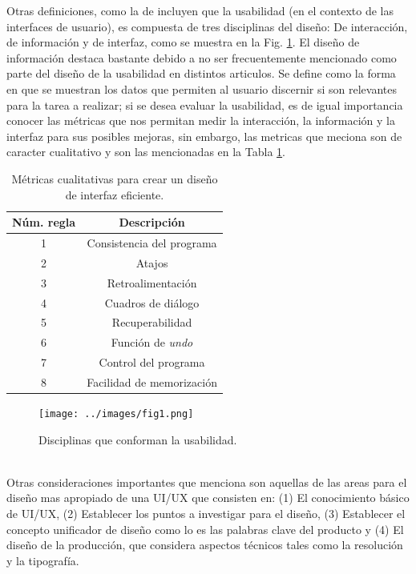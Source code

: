 Otras definiciones, como la de \cite{guntupalli-no-date} %
incluyen que la usabilidad (en el contexto de las interfaces de usuario),
es compuesta de tres disciplinas del diseño: De interacción, de información y de 
interfaz, como se muestra en la Fig. \ref{fig:fig1}. El diseño de información destaca
bastante debido a no ser frecuentemente mencionado como parte del diseño de la usabilidad
en distintos articulos. Se define como la forma en que se muestran los datos que permiten 
al usuario discernir si son relevantes para la tarea a realizar; si se desea evaluar la usabilidad,
es de igual importancia conocer las métricas que nos permitan medir la interacción, la información
y la interfaz para sus posibles mejoras, sin embargo, las metricas que meciona son de caracter 
cualitativo y son las mencionadas en la Tabla \ref{tab1}.
\begin{table}[t]
    \caption{Métricas cualitativas para crear un diseño de interfaz eficiente.}
    \begin{center}
        \begin{tabular}{c c}
        \hline
        \textbf{Núm. regla} & \textbf{Descripción}\\
        \hline
        1 & Consistencia del programa\\
        2 & Atajos\\
        3 & Retroalimentación\\
        4 & Cuadros de diálogo\\
        5 & Recuperabilidad\\
        6 & Función de \emph{undo}\\
        7 & Control del programa\\
        8 & Facilidad de memorización\\
        \hline
        \end{tabular}
    \end{center}
    \label{tab1}
\end{table}
\begin{figure}[t]
    \centering
    \texttt{[image: ../images/fig1.png]}
    \caption{Disciplinas que conforman la usabilidad.}
    \label{fig:fig1}
\end{figure}
\\

Otras consideraciones importantes que \cite{joo-2017}  %
menciona son aquellas de las areas para el diseño mas apropiado de una UI/UX que consisten en:
(1) El conocimiento básico de UI/UX, (2) Establecer los puntos a investigar para el diseño,
(3) Establecer el concepto unificador de diseño como lo es las palabras clave del producto y
(4) El diseño de la producción, que considera aspectos técnicos tales como la resolución y la tipografía.

